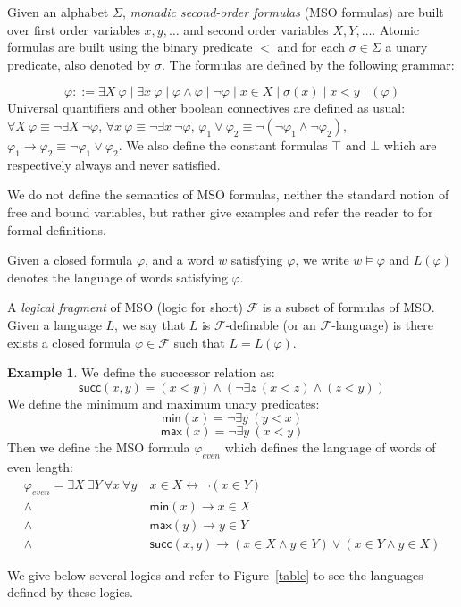 \documentclass[12pt]{report}
\theoremstyle{definition}
\newtheorem{xmp}{Example}[section]
\theoremstyle{remark}
\begin{document}
Given an alphabet $\Sigma$, \emph{monadic second-order formulas} (MSO formulas) are built over first order variables $x,y,\ldots$ and second order variables $X,Y,\ldots$. Atomic formulas are built using the binary predicate $<$ and for each $\sigma \in \Sigma$ a unary predicate, also denoted by $\sigma$. The formulas are defined by the following grammar:

$$\varphi \mathrel{::=}\exists X\ \varphi\mid \exists x\ \varphi\mid \varphi\wedge \varphi \mid \neg \varphi\mid x\in X \mid \sigma(x) \mid x<y\mid (\varphi)$$
Universal quantifiers and other boolean connectives are defined as usual:
$\forall X\ \varphi \equiv \neg \exists X\ \neg \varphi$, $\forall x\ \varphi \equiv \neg \exists x\ \neg \varphi$, $\varphi_1\vee\varphi_2\equiv\neg (\neg \varphi_1 \wedge \neg \varphi_2)$,
$\varphi_1\rightarrow\varphi_2\equiv\neg \varphi_1 \vee \varphi_2$.
We also define the constant formulas $\top$ and $\bot$ which are respectively always and never satisfied.

We do not define the semantics of MSO formulas, neither the standard notion of free and bound variables, but rather give examples and refer the reader to \cite{ebbinghausF95} for formal definitions.

Given a closed formula $\varphi$, and a word $w$ satisfying $\varphi$, we write $w\models \varphi$ and $L(\varphi)$ denotes the language of words satisfying $\varphi$.

A \emph{logical fragment} of MSO (logic for short) $\mathcal F$ is a subset of formulas of MSO. Given a language $L$, we say that $L$ is $\mathcal F$-definable (or an $\mathcal F$-language) is there exists a closed formula $\varphi\in \mathcal F$ such that $L=L(\varphi)$.

\begin{xmp}
We define the successor relation as:
$$\mathsf{succ}(x,y)=(x<y)\wedge (\neg\exists z\ (x<z)\wedge(z<y))$$
We define the minimum and maximum unary predicates:
$$\mathsf{min}(x)=\neg \exists y\ (y<x)$$
$$\mathsf{max}(x)=\neg \exists y\ (x<y)$$
Then we define the MSO formula $\varphi_{even}$ which defines the language of words of even length:
$$\begin{array}{rl}\varphi_{even}=\exists X\ \exists Y\ \forall x\ \forall y\ & x\in  X\leftrightarrow \neg(x\in Y)\\
\wedge&\mathsf{min}(x)\rightarrow x\in X\\
\wedge& \mathsf{max}(y)\rightarrow y\in Y\\
\wedge& \mathsf{succ}(x,y)\rightarrow (x\in X\wedge y\in Y)\vee (x\in Y\wedge y\in X)
\end{array}$$
\end{xmp}
We give below several logics and refer to Figure~\ref{table} to see the languages defined by these logics.
\end{document}
